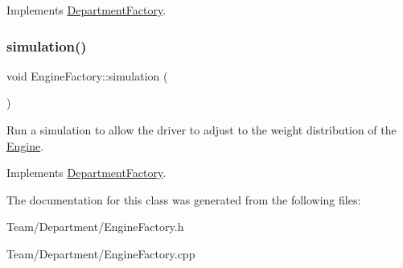 Implements \hyperlink{classDepartmentFactory_a41e5c96ee84f8237cb08d31cd782efae}{Department\+Factory}.

\mbox{\label{classEngineFactory_abcc2b59253cefc7f902a47b19273cf76}} 
\subsubsection{\texorpdfstring{simulation()}{simulation()}}
{\footnotesize\ttfamily void Engine\+Factory\+::simulation (\begin{DoxyParamCaption}{ }\end{DoxyParamCaption})\hspace{0.3cm}{\ttfamily [virtual]}}

Run a simulation to allow the driver to adjust to the weight distribution of the \hyperlink{classEngine}{Engine}. 

Implements \hyperlink{classDepartmentFactory_ad7360e63135822e44031053723ff95fc}{Department\+Factory}.



The documentation for this class was generated from the following files\+:\begin{DoxyCompactItemize}
\item 
Team/\+Department/Engine\+Factory.\+h\item 
Team/\+Department/Engine\+Factory.\+cpp\end{DoxyCompactItemize}
